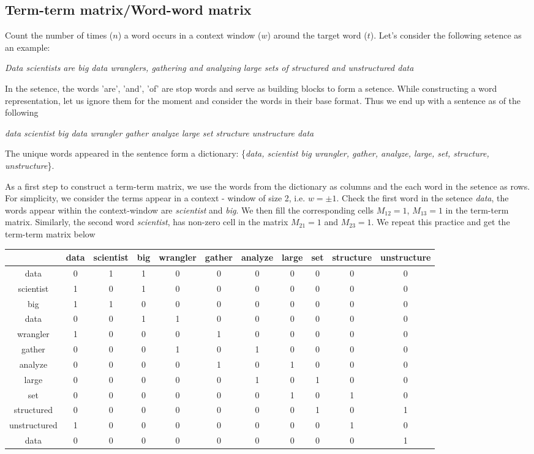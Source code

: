 \documentclass[12pt, oneside]{article}
\begin{document}
\subsection{Term-term matrix/Word-word matrix}
Count the number of times ($n$) a word occurs in a context window ($w$) around the target word ($t$). Let's consider the following setence as an example:

\textit{Data scientists are big data wranglers, gathering and analyzing large sets of structured and unstructured data}

In the setence, the words 'are', 'and', 'of' are stop words and serve as building blocks to form a setence. While constructing a word representation, let us ignore them for the moment and consider the words in their base format. Thus we end up with a sentence as of the following 

\textit{data scientist big data wrangler gather analyze large set structure unstructure data}

The unique words appeared in the sentence form a dictionary: \{\textit{data, scientist big wrangler, gather, analyze, large, set, structure, unstructure}\}. 

As a first step to construct a term-term matrix, we use the words from the dictionary as columns and the each word in the setence as rows. For simplicity, we consider the terms appear in a context - window of size 2, i.e. $w=\pm 1$. Check the first word in the setence \textit{data}, the words appear within the context-window are \textit{scientist} and \textit{big}. We then fill the corresponding cells $M_{12} = 1$, $M_{13} = 1$ in the term-term matrix. Similarly, the second word \textit{scientist}, has non-zero cell in the matrix $M_{21}=1$ and $M_{23}=1$. We repeat this practice and get the term-term matrix below

\begin{tabular}{c c c c c c c c c c c} 
 \hline
   & data &scientist &big &wrangler &gather &analyze &large &set &structure &unstructure\\ [0.5ex] 
 \hline\hline
 data & 0 &1 &1 &0 &0 &0 &0 &0 &0 &0\\ 
 \hline
 scientist & 1 &0 &1 &0 &0 &0 &0 &0 &0 &0\\
 \hline
 big  & 1 &1 &0 &0 &0 &0 &0 &0 &0 &0\\
 \hline
 data& 0 &0 &1 &1 &0 &0 &0 &0 &0 &0\\
 \hline
 wrangler & 1 &0 &0 &0 &1 &0 &0 &0 &0 &0\\
 \hline
 gather& 0 &0 &0 &1 &0 &1 &0 &0 &0 &0\\
 \hline
 analyze& 0 &0 &0 &0 &1 &0 &1 &0 &0 &0\\
 \hline
 large& 0 &0 &0 &0 &0 &1 &0 &1 &0 &0\\
 \hline
 set& 0 &0 &0 &0 &0 &0 &1 &0 &1 &0\\
 \hline
 structured& 0 &0 &0 &0 &0 &0 &0 &1 &0 &1\\
 \hline
 unstructured& 1 &0 &0 &0 &0 &0 &0 &0 &1 &0\\
 \hline 
 data& 0 &0 &0 &0 &0 &0 &0 &0 &0 &1 \\
 \hline
\end{tabular}
\end{document}
